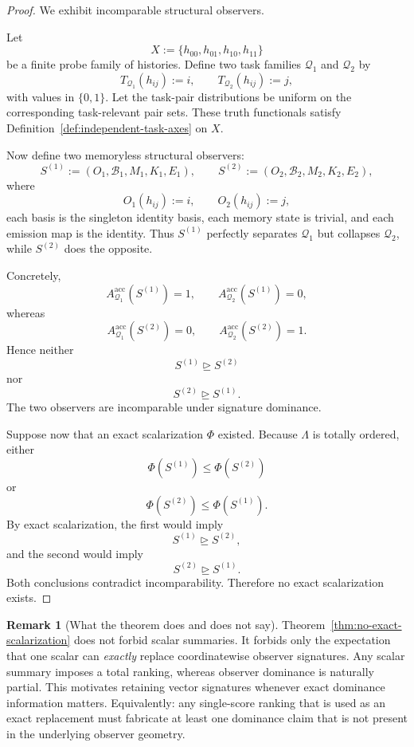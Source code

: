 \documentclass[11pt,twoside]{article}
\theoremstyle{definition}
\newtheorem{remark}[theorem]{Remark}
\newcommand{\acc}{\mathrm{acc}}
\begin{document}
\begin{proof}
We exhibit incomparable structural observers.

Let
\[
  X := \{ h_{00}, h_{01}, h_{10}, h_{11} \}
\]
be a finite probe family of histories. Define two task families \(\mathcal{Q}_1\) and \(\mathcal{Q}_2\) by
\[
  T_{\mathcal{Q}_1}(h_{ij}) := i,
  \qquad
  T_{\mathcal{Q}_2}(h_{ij}) := j,
\]
with values in \(\{0,1\}\). Let the task-pair distributions be uniform on the corresponding task-relevant pair sets.
These truth functionals satisfy Definition~\ref{def:independent-task-axes} on \(X\).

Now define two memoryless structural observers:
\[
  S^{(1)} := (O_1,\mathcal{B}_1,M_1,K_1,E_1),
  \qquad
  S^{(2)} := (O_2,\mathcal{B}_2,M_2,K_2,E_2),
\]
where
\[
  O_1(h_{ij}) := i,
  \qquad
  O_2(h_{ij}) := j,
\]
each basis is the singleton identity basis, each memory state is trivial, and each emission map is the identity. Thus \(S^{(1)}\) perfectly separates \(\mathcal{Q}_1\) but collapses \(\mathcal{Q}_2\), while \(S^{(2)}\) does the opposite.

Concretely,
\[
  A^{\acc}_{\mathcal{Q}_1}(S^{(1)}) = 1,
  \qquad
  A^{\acc}_{\mathcal{Q}_2}(S^{(1)}) = 0,
\]
whereas
\[
  A^{\acc}_{\mathcal{Q}_1}(S^{(2)}) = 0,
  \qquad
  A^{\acc}_{\mathcal{Q}_2}(S^{(2)}) = 1.
\]
Hence neither
\[
  S^{(1)} \trianglerighteq S^{(2)}
\]
nor
\[
  S^{(2)} \trianglerighteq S^{(1)}.
\]
The two observers are incomparable under signature dominance.

Suppose now that an exact scalarization \(\Phi\) existed. Because \(\Lambda\) is totally ordered, either
\[
  \Phi(S^{(1)}) \le \Phi(S^{(2)})
\]
or
\[
  \Phi(S^{(2)}) \le \Phi(S^{(1)}).
\]
By exact scalarization, the first would imply
\[
  S^{(1)} \trianglerighteq S^{(2)},
\]
and the second would imply
\[
  S^{(2)} \trianglerighteq S^{(1)}.
\]
Both conclusions contradict incomparability. Therefore no exact scalarization exists.
\end{proof}

\begin{remark}[What the theorem does and does not say]
\label{rem:no-exact-scalarization-remark}
Theorem~\ref{thm:no-exact-scalarization} does not forbid scalar summaries. It forbids only the expectation that one scalar can \emph{exactly} replace coordinatewise observer signatures. Any scalar summary imposes a total ranking, whereas observer dominance is naturally partial. This motivates retaining vector signatures whenever exact dominance information matters.
Equivalently: any single-score ranking that is used as an exact replacement must fabricate at least one dominance claim that is not present in the underlying observer geometry.
\end{remark}
\end{document}
